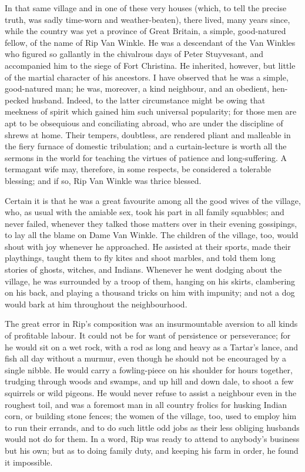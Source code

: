 In that same village and in one of these very houses (which, to tell the precise truth, was sadly time-worn and weather-beaten), there lived, many years since, while the country was yet a province of Great Britain, a simple, good-natured fellow, of the name of Rip Van Winkle. He was a descendant of the Van Winkles who figured so gallantly in the chivalrous days of Peter Stuyvesant, and accompanied him to the siege of Fort Christina. He inherited, however, but little of the martial character of his ancestors. I have observed that he was a simple, good-natured man; he was, moreover, a kind neighbour, and an obedient, hen-pecked husband. Indeed, to the latter circumstance might be owing that meekness of spirit which gained him such universal popularity; for those men are apt to be obsequious and conciliating abroad, who are under the discipline of shrews at home. Their tempers, doubtless, are rendered pliant and malleable in the fiery furnace of domestic tribulation; and a curtain-lecture is worth all the sermons in the world for teaching the virtues of patience and long-suffering. A termagant wife may, therefore, in some respects, be considered a tolerable blessing; and if so, Rip Van Winkle was thrice blessed.

Certain it is that he was a great favourite among all the good wives of the village, who, as usual with the amiable sex, took his part in all family squabbles; and never failed, whenever they talked those matters over in their evening gossipings, to lay all the blame on Dame Van Winkle. The children of the village, too, would shout with joy whenever he approached. He assisted at their sports, made their playthings, taught them to fly kites and shoot marbles, and told them long stories of ghosts, witches, and Indians. Whenever he went dodging about the village, he was surrounded by a troop of them, hanging on his skirts, clambering on his back, and playing a thousand tricks on him with impunity; and not a dog would bark at him throughout the neighbourhood.

The great error in Rip’s composition was an insurmountable aversion to all kinds of profitable labour. It could not be for want of persistence or perseverance; for he would sit on a wet rock, with a rod as long and heavy as a Tartar’s lance, and fish all day without a murmur, even though he should not be encouraged by a single nibble. He would carry a fowling-piece on his shoulder for hours together, trudging through woods and swamps, and up hill and down dale, to shoot a few squirrels or wild pigeons. He would never refuse to assist a neighbour even in the roughest toil, and was a foremost man in all country frolics for husking Indian corn, or building stone fences; the women of the village, too, used to employ him to run their errands, and to do such little odd jobs as their less obliging husbands would not do for them. In a word, Rip was ready to attend to anybody’s business but his own; but as to doing family duty, and keeping his farm in order, he found it impossible.

